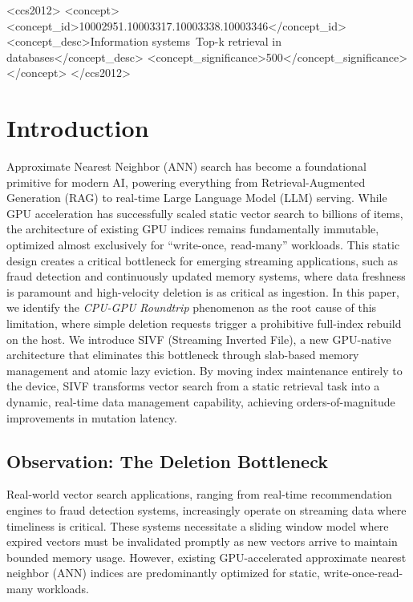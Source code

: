 \documentclass[sigconf,nonacm]{acmart}
\theoremstyle{plain}
\theoremstyle{definition}
\theoremstyle{remark}
\begin{document}
\maketitle


\begin{CCSXML}
<ccs2012>
   <concept>
       <concept_id>10002951.10003317.10003338.10003346</concept_id>
       <concept_desc>Information systems~Top-k retrieval in databases</concept_desc>
       <concept_significance>500</concept_significance>
       </concept>
 </ccs2012>
\end{CCSXML}


\section{Introduction}

Approximate Nearest Neighbor (ANN) search has become a foundational primitive for modern AI, powering everything from Retrieval-Augmented Generation (RAG) to real-time Large Language Model (LLM) serving. While GPU acceleration has successfully scaled static vector search to billions of items, the architecture of existing GPU indices remains fundamentally immutable, optimized almost exclusively for ``write-once, read-many'' workloads. This static design creates a critical bottleneck for emerging streaming applications, such as fraud detection and continuously updated memory systems, where data freshness is paramount and high-velocity deletion is as critical as ingestion. In this paper, we identify the \textit{CPU-GPU Roundtrip} phenomenon as the root cause of this limitation, where simple deletion requests trigger a prohibitive full-index rebuild on the host. We introduce SIVF (Streaming Inverted File), a new GPU-native architecture that eliminates this bottleneck through slab-based memory management and atomic lazy eviction. By moving index maintenance entirely to the device, SIVF transforms vector search from a static retrieval task into a dynamic, real-time data management capability, achieving orders-of-magnitude improvements in mutation latency.

\subsection{Observation: The Deletion Bottleneck}

Real-world vector search applications, ranging from real-time recommendation engines to fraud detection systems, increasingly operate on streaming data where timeliness is critical. These systems necessitate a sliding window model where expired vectors must be invalidated promptly as new vectors arrive to maintain bounded memory usage. However, existing GPU-accelerated approximate nearest neighbor (ANN) indices are predominantly optimized for static, write-once-read-many workloads.
\end{document}
